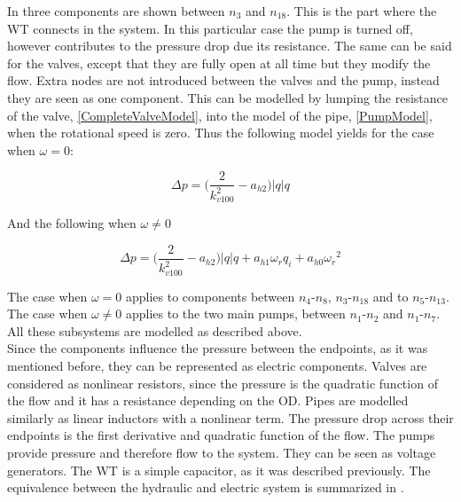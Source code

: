 In  three components are shown between $n_3$ and $n_{18}$. This is the part where the WT connects in the system. In this particular case the pump is turned off, however contributes to the pressure drop due its resistance. The same can be said for the valves, except that they are fully open at all time but they modify the flow. Extra nodes are not introduced between the valves and the pump, instead they are seen as one component. This can be modelled by lumping the resistance of the valve, \eqref{CompleteValveModel}, into the model of the pipe, \eqref{PumpModel}, when the rotational speed is zero. Thus the following model yields for the case when $\omega = 0$:

\begin{equation}
  \Delta p = \Big(\frac{2}{k_{v100}^2} - a_{h2}\Big)|q| q 
  \label{omega_zero}
\end{equation}

And the following when $\omega \neq 0$

\begin{equation}
  \Delta p = \Big(\frac{2}{k_{v100}^2} - a_{h2}\Big)|q| q  + a_{h1} \omega_r q_i + a_{h0}{\omega_r}^2
  \label{omega_notzero}
\end{equation}

The case when $\omega = 0$ applies to components between $n_4$-$n_8$, $n_3$-$n_{18}$  and to $n_5$-$n_{13}$. The case when $\omega \neq 0$ applies to the two main pumps, between $n_1$-$n_2$ and $n_1$-$n_7$. All these subsystems are modelled as described above. 
\\
Since the components influence the pressure between the endpoints, as it was mentioned before, they can be represented as electric components. Valves are considered as nonlinear resistors, since the pressure is the quadratic function of the flow and it has a resistance depending on the OD. Pipes are modelled similarly as linear inductors with a nonlinear term. The pressure drop across their endpoints is the first derivative and quadratic function of the flow. The pumps provide pressure and therefore flow to the system. They can be seen as voltage generators. The WT is a simple capacitor, as it was described previously. The equivalence between the hydraulic and electric system is summarized in .

